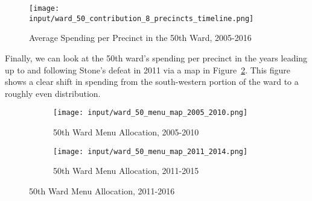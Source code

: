 \begin{figure}[H]
    \centering
    \texttt{[image: input/ward\_50\_contribution\_8\_precincts\_timeline.png]}
    \caption{Average Spending per Precinct in the 50th Ward, 2005-2016}
    \label{fig:stone_spending_timeline}
\end{figure}

Finally, we can look at the 50th ward's spending per precinct in the years leading up to and following Stone's defeat in 2011 via a map in Figure~\ref{fig:stone_spending_maps}.
This figure shows a clear shift in spending from the south-western portion of the ward to a roughly even distribution.

\begin{figure}[H]
    \centering
    \begin{subfigure}[b]{0.45\textwidth} %
    \texttt{[image: input/ward\_50\_menu\_map\_2005\_2010.png]}
    \caption{50th Ward Menu Allocation, 2005-2010}
    \end{subfigure}
    \hfill %
    \begin{subfigure}[b]{0.45\textwidth}
    \texttt{[image: input/ward\_50\_menu\_map\_2011\_2014.png]}
    \caption{50th Ward Menu Allocation, 2011-2015}
    \end{subfigure}
    \caption{50th Ward Menu Allocation, 2011-2016}
    \label{fig:stone_spending_maps}
\end{figure}

